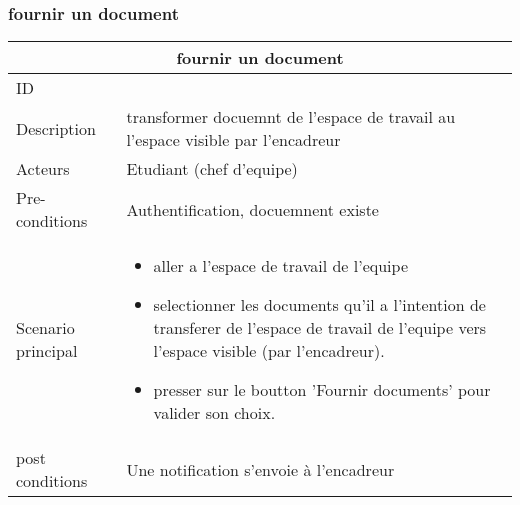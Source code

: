 \documentclass[11pt,fleqn]{book} %
\begin{document}
\subsubsection{fournir un document}
\begin{center}
\begin{tabularx}{1\textwidth} { | p{4cm} | >{\raggedright\arraybackslash}X |  }
  \hline
  \multicolumn{2}{|c|}{fournir un document} \\
 \hline
 ID & 3  \\
 \hline
 Description  &  transformer docuemnt de l'espace de travail au l'espace visible par l'encadreur  \\
  \hline
 Acteurs  & Etudiant (chef d'equipe)  \\
  \hline
 Pre-conditions  & Authentification, docuemnent existe\\
 \hline
 Scenario principal  &  
 \begin{itemize}
     \item aller a l’espace de travail de l’equipe
     \item selectionner les documents qu’il a l’intention de transferer de l’espace de travail de l’equipe vers l’espace visible (par
l’encadreur).
      \item presser sur le boutton ’Fournir documents’ pour valider son choix.

 \end{itemize}\\
  \hline
 post conditions  &  Une notification s’envoie à l'encadreur  \\
  \hline
\end{tabularx}
\label{tbl:nicetablelesstable}
\end{center}
\end{document}
